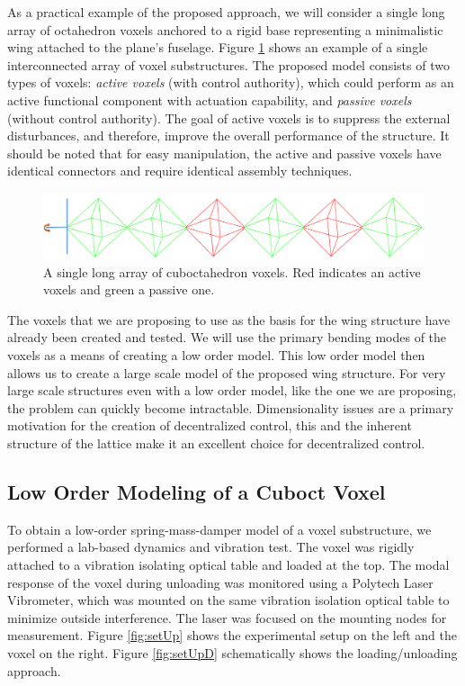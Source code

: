 \documentclass[11pt]{ucthesis}
\begin{document}
As a practical example of the proposed approach, we will consider a single long array of octahedron voxels anchored to a rigid base representing a minimalistic wing attached to the plane's fuselage. Figure \ref{fig:interconnected} shows an example of a single interconnected array of voxel substructures. The proposed model consists of two types of voxels: {\it active voxels} (with control authority), which could perform as an active functional component with actuation capability,  and {\it passive voxels} (without control authority). The goal of active voxels is to suppress the external disturbances, and therefore, improve the overall performance of the structure. It should be noted that for easy manipulation, the active and passive voxels have identical connectors and require identical assembly techniques.  

\begin{figure}[thpb]
\centering
\includegraphics[width=0.75\linewidth]{Figures/exampleInterconnectedStructure.png}
\caption{A single long array of cuboctahedron voxels. Red indicates an active voxels and green a passive one.}
\label{fig:interconnected}
\end{figure}

The voxels that we are proposing to use as the basis for the wing structure have already been created and tested.\cite{jenett2016meso} We will use the primary bending modes of the voxels as a means of creating a low order model. This low order model then allows us to create a large scale model of the proposed wing structure. For very large scale structures even with a low order model, like the one we are proposing, the problem can quickly become intractable. Dimensionality issues are a primary motivation for the creation of decentralized control\cite{bakule2008decentralized}, this and the inherent structure of the lattice make it an excellent choice for decentralized control.

\subsection{Low Order Modeling of a Cuboct Voxel}
\label{sec:model}
To obtain a low-order spring-mass-damper model of a voxel substructure, we performed a lab-based dynamics and vibration test. The voxel was rigidly attached to a vibration isolating optical table and loaded at the top. The modal response of the voxel during unloading was monitored using a Polytech Laser Vibrometer, which was mounted on the same vibration isolation optical table to minimize outside interference. The laser was focused on the mounting nodes for measurement. Figure \ref{fig:setUp} shows the experimental setup on the left and the voxel on the right. Figure \ref{fig:setUpD} schematically shows the loading/unloading approach.
\end{document}
